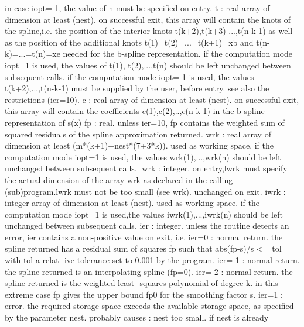 \documentclass[11pt,twoside,nolof]{starlink}
\begin{document}
\begin{terminalv}
           in case iopt=-1, the value of n must be specified on entry.
   t     : real array of dimension at least (nest).
           on successful exit, this array will contain the knots of the
           spline,i.e. the position of the interior knots t(k+2),t(k+3)
           ...,t(n-k-1) as well as the position of the additional knots
           t(1)=t(2)=...=t(k+1)=xb and t(n-k)=...=t(n)=xe needed for
           the b-spline representation.
           if the computation mode iopt=1 is used, the values of t(1),
           t(2),...,t(n) should be left unchanged between subsequent
           calls. if the computation mode iopt=-1 is used, the values
           t(k+2),...,t(n-k-1) must be supplied by the user, before
           entry. see also the restrictions (ier=10).
   c     : real array of dimension at least (nest).
           on successful exit, this array will contain the coefficients
           c(1),c(2),..,c(n-k-1) in the b-spline representation of s(x)
   fp    : real. unless ier=10, fp contains the weighted sum of
           squared residuals of the spline approximation returned.
   wrk   : real array of dimension at least (m*(k+1)+nest*(7+3*k)).
           used as working space. if the computation mode iopt=1 is
           used, the values wrk(1),...,wrk(n) should be left unchanged
           between subsequent calls.
   lwrk  : integer. on entry,lwrk must specify the actual dimension of
           the array wrk as declared in the calling (sub)program.lwrk
           must not be too small (see wrk). unchanged on exit.
   iwrk  : integer array of dimension at least (nest).
           used as working space. if the computation mode iopt=1 is
           used,the values iwrk(1),...,iwrk(n) should be left unchanged
           between subsequent calls.
   ier   : integer. unless the routine detects an error, ier contains a
           non-positive value on exit, i.e.
    ier=0  : normal return. the spline returned has a residual sum of
             squares fp such that abs(fp-s)/s <= tol with tol a relat-
             ive tolerance set to 0.001 by the program.
    ier=-1 : normal return. the spline returned is an interpolating
             spline (fp=0).
    ier=-2 : normal return. the spline returned is the weighted least-
             squares polynomial of degree k. in this extreme case fp
             gives the upper bound fp0 for the smoothing factor s.
    ier=1  : error. the required storage space exceeds the available
             storage space, as specified by the parameter nest.
             probably causes : nest too small. if nest is already

\end{terminalv}
\end{document}
